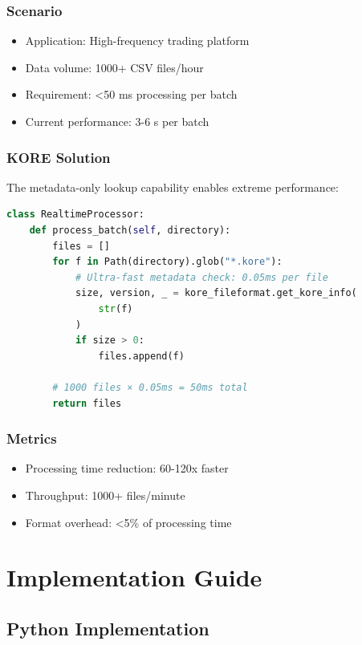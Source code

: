 \documentclass[12pt,a4paper]{report}
\begin{document}
\subsection{Scenario}
\begin{itemize}
    \item Application: High-frequency trading platform
    \item Data volume: 1000+ CSV files/hour
    \item Requirement: <50 ms processing per batch
    \item Current performance: 3-6 s per batch
\end{itemize}

\subsection{KORE Solution}

The metadata-only lookup capability enables extreme performance:

\begin{lstlisting}[language=Python]
class RealtimeProcessor:
    def process_batch(self, directory):
        files = []
        for f in Path(directory).glob("*.kore"):
            # Ultra-fast metadata check: 0.05ms per file
            size, version, _ = kore_fileformat.get_kore_info(
                str(f)
            )
            if size > 0:
                files.append(f)
        
        # 1000 files × 0.05ms = 50ms total
        return files
\end{lstlisting}

\subsection{Metrics}
\begin{itemize}
    \item Processing time reduction: 60-120x faster
    \item Throughput: 1000+ files/minute
    \item Format overhead: <5\% of processing time
\end{itemize}

\chapter{Implementation Guide}

\section{Python Implementation}
\end{document}
